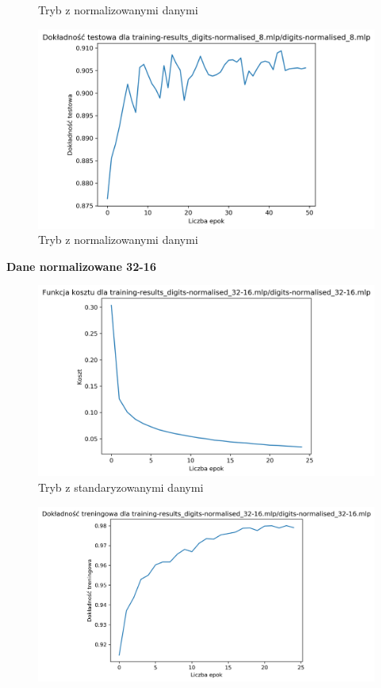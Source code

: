 \documentclass{classrep}
\begin{document}
{{{\begin{figure}[!htbp]
                    \caption{Tryb z normalizowanymi danymi}
                \end{figure}
                \begin{figure}[!htbp]
                    \centering
                    \includegraphics[width=155mm]{wykresy/digits-normalised_8_mlp_testing-accuracy.png}
                    \caption{Tryb z normalizowanymi danymi}
                \end{figure}
                \FloatBarrier
                \textbf{Dane normalizowane 32-16}
                \begin{figure}[!htbp]
                    \centering
                    \includegraphics[width=155mm]{wykresy/digits-normalised_32-16_mlp_cost.png}
                    \caption{Tryb z standaryzowanymi danymi}
                \end{figure}
                \begin{figure}[!htbp]
                    \centering
                    \includegraphics[width=165mm]{wykresy/digits-normalised_32-16_mlp_training-accuracy.png}

\end{figure}}}}
\end{document}
